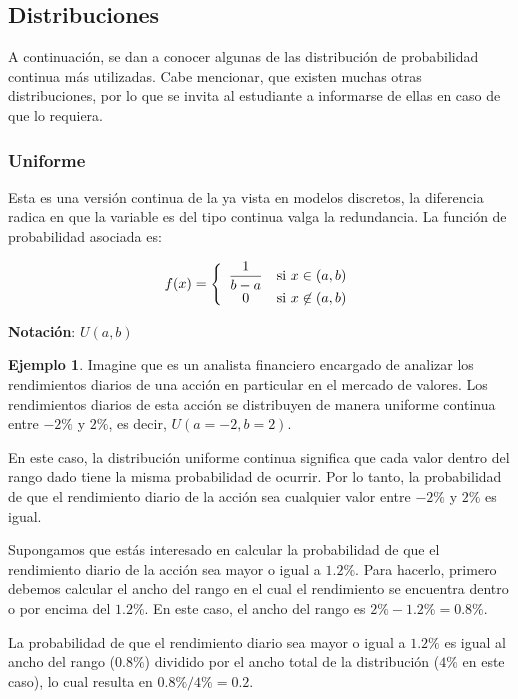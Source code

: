 \documentclass[
  11pt,
]{book}
\theoremstyle{definition}
\theoremstyle{definition}
\newtheorem{example}{Ejemplo}[chapter]
\theoremstyle{definition}
\theoremstyle{definition}
\theoremstyle{remark}
\begin{document}
\subsection{Distribuciones}\label{distribuciones-1}

A continuación, se dan a conocer algunas de las distribución de probabilidad continua más utilizadas. Cabe mencionar, que existen muchas otras distribuciones, por lo que se invita al estudiante a informarse de ellas en caso de que lo requiera.

\subsubsection{Uniforme}\label{uniforme-1}

Esta es una versión continua de la ya vista en modelos discretos, la diferencia radica en que la variable es del tipo continua valga la redundancia. La función de probabilidad asociada es:

\begin{equation}
\notag
f(x) = \left\lbrace
\begin{array}{cl}
\displaystyle\frac{1}{b-a} & \text{si } x \in (a,b)\\
0 & \text{si } x \not\in (a,b)
\end{array}
\right.
\end{equation}

\textbf{Notación}: \(U(a,b)\)

\begin{example}
Imagine que es un analista financiero encargado de analizar los rendimientos diarios de una acción en particular en el mercado de valores. Los rendimientos diarios de esta acción se distribuyen de manera uniforme continua entre \(-2\%\) y \(2\%\), es decir, \(U(a = -2, b = 2)\).

En este caso, la distribución uniforme continua significa que cada valor dentro del rango dado tiene la misma probabilidad de ocurrir. Por lo tanto, la probabilidad de que el rendimiento diario de la acción sea cualquier valor entre \(-2\%\) y \(2\%\) es igual.

Supongamos que estás interesado en calcular la probabilidad de que el rendimiento diario de la acción sea mayor o igual a \(1.2\%\). Para hacerlo, primero debemos calcular el ancho del rango en el cual el rendimiento se encuentra dentro o por encima del \(1.2\%\). En este caso, el ancho del rango es \(2\% - 1.2\% = 0.8\%\).

La probabilidad de que el rendimiento diario sea mayor o igual a \(1.2\%\) es igual al ancho del rango (\(0.8\%\)) dividido por el ancho total de la distribución (\(4\%\) en este caso), lo cual resulta en \(0.8\%/4\% = 0.2\).
\end{example}
\end{document}
